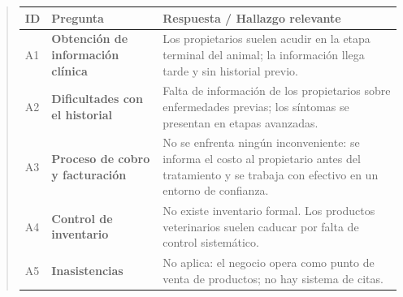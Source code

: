 \documentclass[
]{article}
\newcounter{none} %
\begin{document}
\begin{quote}
{\def\LTcaptype{none} %
\begin{longtable}[]{|
  >{\centering\arraybackslash}p{}|
  >{\raggedright\arraybackslash}p{}|
  >{\raggedright\arraybackslash}p{}|}
\hline
\begin{minipage}[b]{\linewidth}\centering
\textbf{ID}
\end{minipage} & \begin{minipage}[b]{\linewidth}\centering
\textbf{Pregunta}
\end{minipage} & \begin{minipage}[b]{\linewidth}\raggedright
\textbf{Respuesta / Hallazgo relevante}
\end{minipage} \\
\hline
\endhead
\hline
\endlastfoot
A1 & \textbf{Obtención de información clínica} &
\begin{minipage}[t]{\linewidth}\raggedright
Los propietarios suelen acudir en la etapa terminal del animal; la
información llega tarde y sin historial previo.
\end{minipage} \\
\hline
A2 & \textbf{Dificultades con el historial} &
\begin{minipage}[t]{\linewidth}\raggedright
Falta de información de los propietarios sobre enfermedades previas; los
síntomas se presentan en etapas avanzadas.
\end{minipage} \\
\hline
A3 & \textbf{Proceso de cobro y facturación} &
\begin{minipage}[t]{\linewidth}\raggedright
No se enfrenta ningún inconveniente: se informa el costo al propietario
antes del tratamiento y se trabaja con efectivo en un entorno de
confianza.
\end{minipage} \\
\hline
A4 & \textbf{Control de inventario} &
\begin{minipage}[t]{\linewidth}\raggedright
No existe inventario formal. Los productos veterinarios suelen caducar
por falta de control sistemático.
\end{minipage} \\
\hline
A5 & \textbf{Inasistencias} &
\begin{minipage}[t]{\linewidth}\raggedright
No aplica: el negocio opera como punto de venta de productos; no hay
sistema de citas.
\end{minipage} \\
\hline
\end{longtable}
}


\end{quote}
\end{document}
